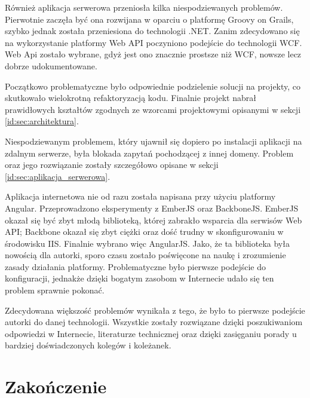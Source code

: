 \documentclass[a4paper]{book}
\begin{document}
	Również aplikacja serwerowa przeniosła kilka niespodziewanych problemów. Pierwotnie zaczęła być ona rozwijana w oparciu o platformę Groovy on Grails\cite{id:GroovyOnGrails}, szybko jednak została przeniesiona do technologii .NET. Zanim zdecydowano się na wykorzystanie platformy Web API poczyniono podejście do technologii WCF\cite{id:WCF}. Web Api zostało wybrane, gdyż jest ono znacznie prostsze niż WCF, nowsze lecz dobrze udokumentowane.
	
	Początkowo problematyczne było odpowiednie podzielenie solucji na projekty, co skutkowało wielokrotną refaktoryzacją kodu. Finalnie projekt nabrał prawidłowych kształtów zgodnych ze wzorcami projektowymi opisanymi w sekcji \ref{id:sec:architektura}. 
	
	Niespodziewanym problemem, który ujawnił się dopiero po instalacji aplikacji na zdalnym serwerze, była blokada zapytań pochodzącej z innej domeny. Problem oraz jego rozwiązanie zostały szczegółowo opisane w sekcji \ref{id:sec:aplikacja_serwerowa}.
	
	Aplikacja internetowa nie od razu została napisana przy użyciu platformy Angular. Przeprowadzono eksperymenty z EmberJS\cite{id:Ember} oraz BackboneJS\cite{id:Backbone}. EmberJS okazał się być zbyt młodą biblioteką, której zabrakło wsparcia dla serwisów Web API; Backbone okazał się zbyt ciężki oraz dość trudny w skonfigurowaniu w środowisku IIS. Finalnie wybrano więc AngularJS. Jako, że ta biblioteka była nowością dla autorki, sporo czasu zostało poświęcone na naukę i zrozumienie zasady działania platformy. Problematyczne było pierwsze podejście do konfiguracji, jednakże dzięki bogatym zasobom w Internecie udało się ten problem sprawnie pokonać. 
	
	Zdecydowana większość problemów wynikała z tego, że było to pierwsze podejście autorki do danej technologii. Wszystkie zostały rozwiązane dzięki poszukiwaniom odpowiedzi w Internecie, literaturze technicznej oraz dzięki zasięganiu porady u bardziej doświadczonych kolegów i koleżanek. 
	
	
	\chapter{Zakończenie}
	\label{id:cha:zakonczenie}
	
	
	
	
	
\end{document}
